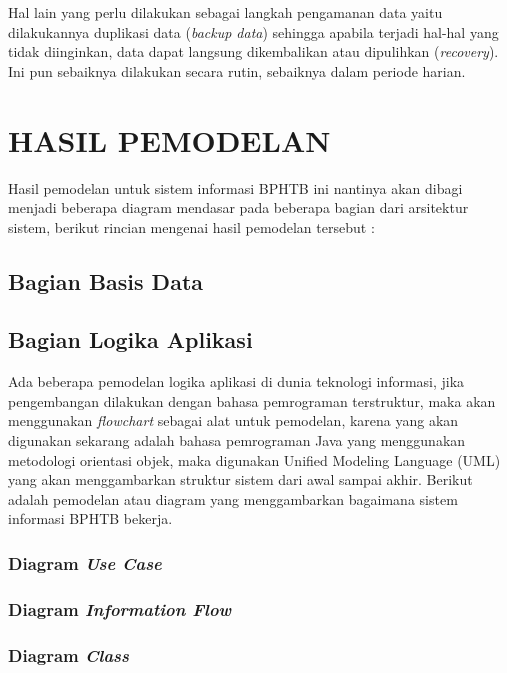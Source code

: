 \documentclass[pdftex,12pt, oneside]{article}
\begin{document}
Hal lain yang perlu dilakukan sebagai langkah pengamanan data yaitu dilakukannya duplikasi data (\textit{backup data}) sehingga apabila terjadi hal-hal yang tidak diinginkan, data dapat langsung dikembalikan atau dipulihkan (\textit{recovery}). Ini pun sebaiknya dilakukan secara rutin, sebaiknya dalam periode harian.

\section{HASIL PEMODELAN}

Hasil pemodelan untuk sistem informasi BPHTB ini nantinya akan dibagi menjadi beberapa diagram mendasar pada beberapa bagian dari arsitektur sistem, berikut rincian mengenai hasil pemodelan tersebut :

\subsection{Bagian Basis Data}

\subsection{Bagian Logika Aplikasi}

Ada beberapa pemodelan logika aplikasi di dunia teknologi informasi, jika pengembangan dilakukan dengan bahasa pemrograman terstruktur, maka akan menggunakan \textit{flowchart} sebagai alat untuk pemodelan, karena yang akan digunakan sekarang adalah bahasa pemrograman Java yang menggunakan metodologi orientasi objek, maka digunakan Unified Modeling Language (UML) yang akan menggambarkan struktur sistem dari awal sampai akhir. Berikut adalah pemodelan atau diagram yang menggambarkan bagaimana sistem informasi BPHTB bekerja.

\subsubsection{Diagram \textit{Use Case}}



\subsubsection{Diagram \textit{Information Flow}}


\subsubsection{Diagram \textit{Class}}
\end{document}
